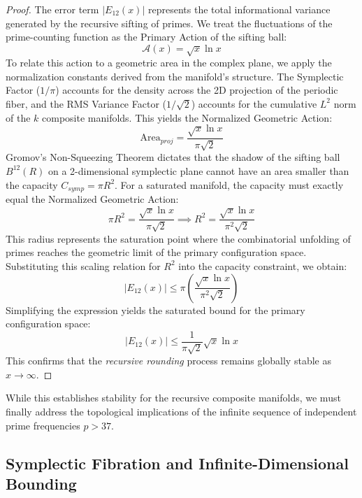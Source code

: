 \documentclass[sn-mathphys-num, pdflatex, referee]{sn-jnl}
\begin{document}
\begin{proof}
The error term $|E_{12}(x)|$ represents the total informational variance generated by the recursive sifting of primes. We treat the fluctuations of the prime-counting function as the Primary Action of the sifting ball:
\begin{equation}
\mathcal{A}(x) = \sqrt{x} \ln x
\end{equation}
To relate this action to a geometric area in the complex plane, we apply the normalization constants derived from the manifold’s structure. The Symplectic Factor ($1/\pi$) accounts for the density across the 2D projection of the periodic fiber, and the RMS Variance Factor ($1/\sqrt{2}$) accounts for the cumulative $L^2$ norm of the $k$ composite manifolds. This yields the Normalized Geometric Action:
\begin{equation}
\text{Area}_{proj} = \frac{\sqrt{x} \ln x}{\pi \sqrt{2}}
\end{equation}
Gromov’s Non-Squeezing Theorem dictates that the shadow of the sifting ball $B^{12}(R)$ on a 2-dimensional symplectic plane cannot have an area smaller than the capacity $C_{symp} = \pi R^2$. For a saturated manifold, the capacity must exactly equal the Normalized Geometric Action:
\begin{equation}
\pi R^2 = \frac{\sqrt{x} \ln x}{\pi \sqrt{2}} \implies R^2 = \frac{\sqrt{x} \ln x}{\pi^2 \sqrt{2}}
\end{equation}
This radius represents the saturation point where the combinatorial unfolding of primes reaches the geometric limit of the primary configuration space. Substituting this scaling relation for $R^2$ into the capacity constraint, we obtain:
\begin{equation}
|E_{12}(x)| \le \pi \left( \frac{\sqrt{x} \ln x}{\pi^2 \sqrt{2}} \right)
\end{equation}
Simplifying the expression yields the saturated bound for the primary configuration space:
\begin{equation}
|E_{12}(x)| \le \frac{1}{\pi\sqrt{2}} \sqrt{x} \ln x
\end{equation}
This confirms that the \textit{recursive rounding} process remains globally stable as $x \to \infty$.
\end{proof}

While this establishes stability for the recursive composite manifolds, we must finally address the topological implications of the infinite sequence of independent prime frequencies $p > 37$.

\subsection{Symplectic Fibration and Infinite-Dimensional Bounding}
\label{sec:fibration}
\end{document}
